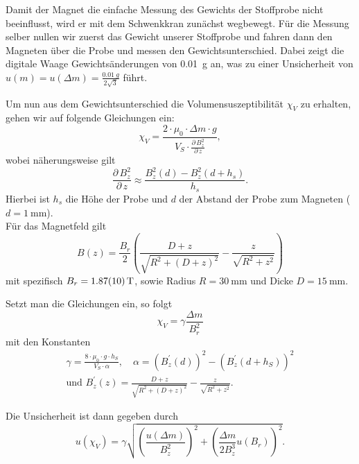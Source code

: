 \documentclass[11pt,a4paper,titlepage, ngerman]{article}
\begin{document}
			Damit der Magnet die einfache Messung des Gewichts der Stoffprobe nicht beeinflusst, wird er mit dem Schwenkkran zunächst wegbewegt.
			Für die Messung selber nullen wir zuerst das Gewicht unserer Stoffprobe und fahren dann den Magneten über die Probe und messen den Gewichtsunterschied.
			Dabei zeigt die digitale Waage Gewichtsänderungen von \SI{0,01}{g} an, was zu einer Unsicherheit von $u(m) = u(\Delta m) = \frac{\SI{0,01}{g}}{2\sqrt{3}}$ führt.
		
			Um nun aus dem Gewichtsunterschied die Volumensuszeptibilität $\chi _V$ zu erhalten, gehen wir auf folgende Gleichungen ein:
			\begin{equation*}
				\chi_V = \frac{2 \cdot \mu_0 \cdot \Delta m \cdot g}{V_S \cdot \frac{\partial\,B^2_z}{\partial\,z}},
			\end{equation*}
			wobei näherungsweise gilt
			\begin{equation*}
				\frac{\partial\,B^2_z}{\partial\,z} \approx \frac{B_z^2(d) - B_z^2(d+h_s)}{h_s}.
			\end{equation*}
			Hierbei ist $h_s$ die Höhe der Probe und $d$ der Abstand der Probe zum Magneten ($d = \SI{1}{\mm}$).\\
			Für das Magnetfeld gilt
			\begin{equation*}
			B(z) = \frac{B_r}{2}\left( \frac{D+z}{\sqrt{R^2 + (D+z)^2}} - \frac{z}{\sqrt{R^2 + z^2}}\right)
			\end{equation*}
			mit spezifisch $B_r = \SI{1,87+-0,1}{T}$, sowie Radius $R = \SI{30}{\milli\meter}$ und Dicke $D = \SI{15}{\milli\meter}$.
			
			Setzt man die Gleichungen ein, so folgt
			\begin{equation}
			\chi_V = \gamma \frac{\Delta m}{B_r^2}
			\label{eq:chi_V}
			\end{equation}
			mit den Konstanten
			\begin{align*}
			\gamma = \frac{8 \cdot \mu_0\cdot g \cdot h_S}{V_S \cdot \alpha},\quad
			\alpha = \left( B_z^{'}(d)\right)^2-\left( B_z^{'}(d+h_S)\right) ^2\\
			\text{und }B_z^{'}(z) = \frac{D+z}{\sqrt{R^2 + (D+z)^2}} - \frac{z}{\sqrt{R^2+z^2}}.
			\end{align*}
			
			Die Unsicherheit ist dann gegeben durch
			\begin{equation}
				u(\chi_V) = \gamma\sqrt{\left( \frac{u(\Delta m)}{B_z^2}\right) ^2+\left( \frac{\Delta m}{2B_z^3}u(B_r)\right) ^2}.
			\end{equation}
				
\end{document}
